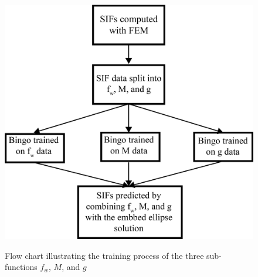 \begin{figure}
    \centering
    \includegraphics[width=\textwidth]{geometry_figures/training_flow.png}
    \label{fig:training_flow}
    \caption{Flow chart illustrating the training process of the three sub-functions $f_w$, $M$, and $g$}
\end{figure}




